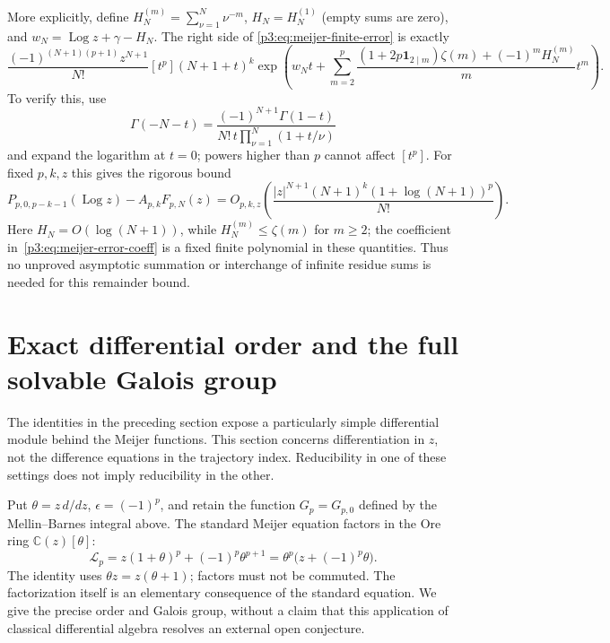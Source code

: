 \documentclass[11pt,a4paper]{article}
\theoremstyle{definition}
\theoremstyle{remark}
\DeclareMathOperator{\Log}{Log}
\numberwithin{equation}{section}
\begin{document}
More explicitly, define $H_N^{(m)}=\sum_{\nu=1}^N\nu^{-m}$, $H_N=H_N^{(1)}$
(empty sums are zero), and $w_N=\Log z+\gamma-H_N$. The right side of
\eqref{p3:eq:meijer-finite-error} is exactly
\begin{equation}\label{p3:eq:meijer-error-coeff}
 \frac{(-1)^{(N+1)(p+1)}z^{N+1}}{N!}[t^p](N+1+t)^k
 \exp\left(w_Nt+
  \sum_{m=2}^{p}
   \frac{(1+2p\mathbf1_{2\mid m})\zeta(m)+(-1)^mH_N^{(m)}}{m}t^m
       \right).
\end{equation}
To verify this, use
\[
 \Gamma(-N-t)=\frac{(-1)^{N+1}\Gamma(1-t)}
                    {N!\,t\prod_{\nu=1}^N(1+t/\nu)}
\]
and expand the logarithm at $t=0$; powers higher than $p$ cannot affect
$[t^p]$. For fixed $p,k,z$ this gives the rigorous bound
\[
 P_{p,0,p-k-1}(\Log z)-A_{p,k}F_{p,N}(z)
 =O_{p,k,z}\left(
     \frac{|z|^{N+1}(N+1)^k(1+\log(N+1))^p}{N!}\right).
\]
Here $H_N=O(\log(N+1))$, while $H_N^{(m)}\le\zeta(m)$ for $m\ge2$;
the coefficient in~\eqref{p3:eq:meijer-error-coeff} is a fixed finite
polynomial in these quantities. Thus no unproved asymptotic summation or
interchange of infinite residue sums is needed for this remainder bound.


\section{Exact differential order and the full solvable Galois group}
\label{p3:sec:diff-structure}

The identities in the preceding section expose a particularly simple
differential module behind the Meijer functions.  This section concerns
differentiation in $z$, not the difference equations in the trajectory
index.  Reducibility in one of these settings does not imply reducibility
in the other.

Put $\theta=z\,d/dz$, $\epsilon=(-1)^p$, and retain the function
$G_p=G_{p,0}$ defined by the Mellin--Barnes integral above.
The standard Meijer equation factors in the Ore ring $\mathbb C(z)[\theta]$:
\begin{equation}\label{p3:eq:factor-meijer}
 \mathcal L_p=z(1+\theta)^p+(-1)^p\theta^{p+1}
      =\theta^p\bigl(z+(-1)^p\theta\bigr).
\end{equation}
The identity uses $\theta z=z(\theta+1)$; factors must not be commuted.
The factorization itself is an elementary consequence of the standard
equation.  We give the precise order and Galois group, without a claim that
this application of classical differential algebra resolves an external
open conjecture.
\end{document}
